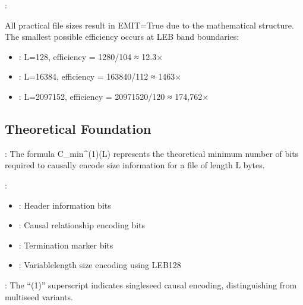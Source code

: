 \documentclass[letterpaper,10pt,english]{sphinxmanual}
\begin{document}
\sphinxAtStartPar
{}:

\sphinxAtStartPar
All practical file sizes result in EMIT=True due to the mathematical structure. The smallest possible efficiency occurs at LEB band boundaries:
\begin{itemize}
\item {} 
\sphinxAtStartPar
{}: L=128, efficiency = 1280/104 ≈ 12.3×

\item {} 
\sphinxAtStartPar
{}: L=16384, efficiency = 163840/112 ≈ 1463×

\item {} 
\sphinxAtStartPar
{}: L=2097152, efficiency = 20971520/120 ≈ 174,762×

\end{itemize}


\subsection{Theoretical Foundation}
\label{\detokenize{mathematical_foundation:theoretical-foundation}}
\sphinxAtStartPar
{}: The formula C\_min\textasciicircum{}(1)(L) represents the theoretical minimum number of bits required to causally encode size information for a file of length L bytes.

\sphinxAtStartPar
{}:
\begin{itemize}
\item {} 
\sphinxAtStartPar
{}: Header information bits

\item {} 
\sphinxAtStartPar
{}: Causal relationship encoding bits

\item {} 
\sphinxAtStartPar
{}: Termination marker bits

\item {} 
\sphinxAtStartPar
{}: Variable\sphinxhyphen{}length size encoding using LEB128

\end{itemize}

\sphinxAtStartPar
{}: The “(1)” superscript indicates single\sphinxhyphen{}seed causal encoding, distinguishing from multi\sphinxhyphen{}seed variants.
\end{document}
